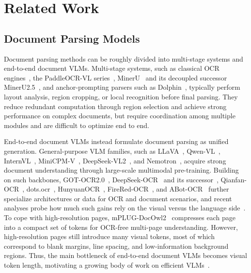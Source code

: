 \section{Related Work}
\label{sec:related}

\subsection{Document Parsing Models}

Document parsing methods can be roughly divided into multi-stage systems and end-to-end document VLMs. Multi-stage systems, such as classical OCR engines~\cite{paddleocrv2}, the PaddleOCR-VL series~\cite{cui2026paddleocrvl,cui2025paddleocr3}, MinerU~\cite{wang2024mineru} and its decoupled successor MinerU2.5~\cite{niu2025mineru25}, and anchor-prompting parsers such as Dolphin~\cite{feng2025dolphin}, typically perform layout analysis, region cropping, or local recognition before final parsing. They reduce redundant computation through region selection and achieve strong performance on complex documents, but require coordination among multiple modules and are difficult to optimize end to end.

End-to-end document VLMs instead formulate document parsing as unified generation. General-purpose VLM families, such as LLaVA~\cite{liu2023llava}, Qwen-VL~\cite{bai2023qwenvl,wang2024qwen2vl}, InternVL~\cite{chen2024internvl}, MiniCPM-V~\cite{minicpmv2024}, DeepSeek-VL2~\cite{wu2024deepseekvl2}, and Nemotron~\cite{nemotron2026}, acquire strong document understanding through large-scale multimodal pre-training. Building on such backbones, GOT-OCR2.0~\cite{wei2024got}, DeepSeek-OCR~\cite{wei2025deepseekocr} and its successor~\cite{deepseekocr2}, Qianfan-OCR~\cite{dong2026qianfanocr}, dots.ocr~\cite{li2025dotsocr}, HunyuanOCR~\cite{lyu2025hunyuanocr}, FireRed-OCR~\cite{wu2026firered}, and ABot-OCR~\cite{jiang2026abot} further specialize architectures or data for OCR and document scenarios, and recent analyses probe how much such gains rely on the visual versus the language side~\cite{deepseekocr_crutch2026}. To cope with high-resolution pages, mPLUG-DocOwl2~\cite{hu2024docowl2} compresses each page into a compact set of tokens for OCR-free multi-page understanding. However, high-resolution pages still introduce many visual tokens, most of which correspond to blank margins, line spacing, and low-information background regions. Thus, the main bottleneck of end-to-end document VLMs becomes visual token length, motivating a growing body of work on efficient VLMs~\cite{shinde2025surveyefficientvlm,tokencompression_survey2025}.

